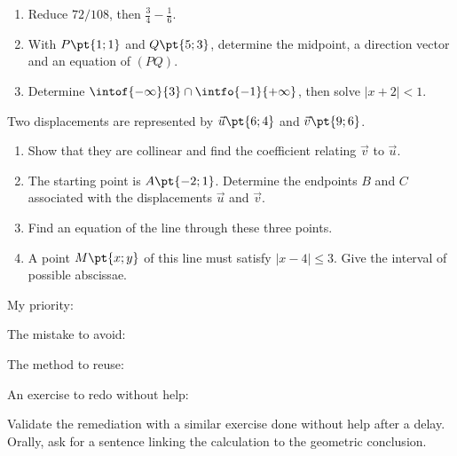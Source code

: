 \begin{example}\begin{enumerate}
\item Reduce $72/108$, then $\frac34-\frac16$.
\item With $P\pt{1;1}$ and $Q\pt{5;3}$, determine the midpoint, a direction vector and an equation of $(PQ)$.
\item Determine $\intof{-\infty}{3}\cap\intfo{-1}{+\infty}$, then solve $|x+2|<1$.
\end{enumerate}\end{example}
\begin{example}Two displacements are represented by $\vec u\pt{6;4}$ and $\vec v\pt{9;6}$.
\begin{enumerate}\item Show that they are collinear and find the coefficient relating $\vec v$ to $\vec u$.
\item The starting point is $A\pt{-2;1}$. Determine the endpoints $B$ and $C$ associated with the displacements $\vec u$ and $\vec v$.
\item Find an equation of the line through these three points.
\item A point $M\pt{x;y}$ of this line must satisfy $|x-4|\leq3$. Give the interval of possible abscissae.
\end{enumerate}\end{example}
\begin{keypoint}[My review]
My priority: \dotfill\par The mistake to avoid: \dotfill\par The method to reuse: \dotfill\par An exercise to redo without help: \dotfill
\end{keypoint}
\begin{teachernote}Validate the remediation with a similar exercise done without help after a delay. Orally, ask for a sentence linking the calculation to the geometric conclusion.\end{teachernote}
